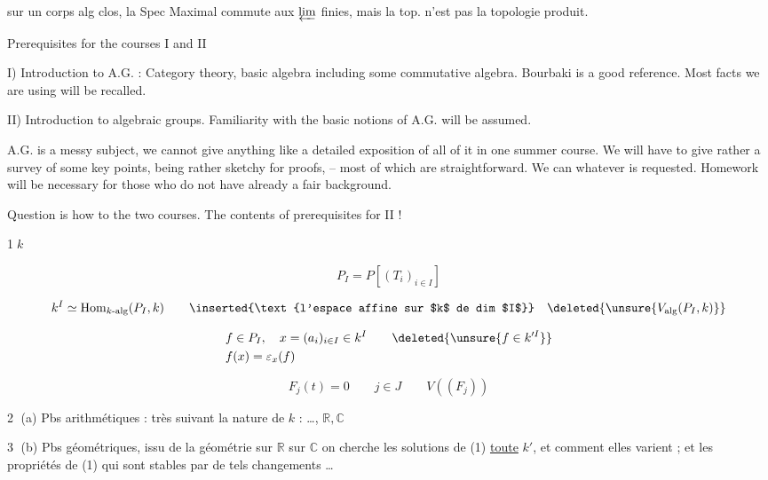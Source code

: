   sur un corps alg clos, la  Spec Maximal  commute aux $\varprojlim$ finies, mais la top. n'est pas la topologie produit.


Prerequisites for the courses I and II

I) Introduction to A.G. : Category theory, basic algebra including some commutative algebra. Bourbaki is a good reference. Most facts we are using will be recalled.

II) Introduction to algebraic groups. Familiarity with the basic notions of A.G. will be assumed.

A.G. is a messy subject,  we cannot give anything like a detailed exposition of all of it in one summer course. We will have to give rather a survey of some key points, being rather sketchy for proofs, -- most of which are straightforward. We can  whatever is requested. Homework will be necessary for those who do not have already a fair background.

Question is how to  the two courses. The contents of   prerequisites for II !

\textcircled{1}\quad $k$

\[
P_I=P[(T_i)_{i\in I}]
\]

\[
k^I\simeq\mathrm{Hom}_{k\text{-}\mathrm{alg}}(P_I,k)
\qquad\inserted{\text{l'espace affine sur $k$ de dim $I$}}\quad\deleted{\unsure{V_{\mathrm{alg}}(P_I,k)}}
\]


\[
\begin{aligned}
&f\in P_I,\quad x=(a_i)_{i\in I}\in k^I\qquad\deleted{\unsure{f\in k^{\prime I}}}\\
&f(x)=\varepsilon_x(f)
\end{aligned}
\]

\[
F_j(t)=0\qquad j\in J\qquad V((F_j)) \tag*{(1)}
\]

\textcircled{2} (a) Pbs  arithmétiques : très  suivant la nature de $k$ : \ldots, $\mathbb R,\mathbb C$

\textcircled{3} (b) Pbs  géométriques, issu de la géométrie sur $\mathbb R$  sur $\mathbb C$ on cherche les solutions de (1)  \uline{toute}   $k'$,  et comment elles varient ; et les propriétés de (1) qui sont stables par de tels changements \ldots

